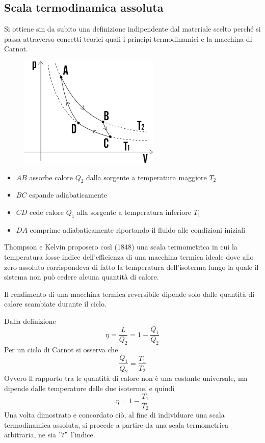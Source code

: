 \documentclass[a4paper, 15pt]{article}
\begin{document}
\subsection{Scala termodinamica assoluta}
\begin{adjustwidth}{2in}{}
	Si ottiene sin da subito una definizione indipendente dal materiale scelto perché si passa attraverso concetti teorici quali i principi termodinamici e la macchina di Carnot.
	\begin{figure}[H]
		\centering
		\includegraphics[width=0.3\linewidth]{immagini/screenshot002}
		\label{fig:screenshot002}
	\end{figure}
	\begin{itemize}
		\item $AB$ assorbe calore $Q_2$ dalla sorgente a temperatura maggiore $T_2$
		\item $BC$ espande adiabaticamente 
		\item $CD$ cede calore $Q_1$ alla sorgente a temperatura inferiore $T_1$
		\item $DA$ comprime adiabaticamente riportando il fluido alle condizioni iniziali
	\end{itemize}
	Thompson e Kelvin proposero così (1848) una scala termometrica in cui la temperatura fosse indice dell'efficienza di una macchina termica ideale dove allo zero assoluto corrispondeva di fatto la temperatura dell'isoterma lungo la quale il sistema non può cedere alcuna quantità di calore.
	
	Il rendimento di una macchina termica reversibile dipende solo dalle quantità di calore scambiate durante il ciclo.
	
	Dalla definizione
	\[\eta = \dfrac{L}{Q_2} = 1 - \dfrac{Q_1}{Q_2}\]
	Per un ciclo di Carnot si osserva che 
	\[\dfrac{Q_1}{Q_2} = \dfrac{T_1}{T_2}\] 
	Ovvero ll rapporto tra le quantità di calore non è una costante universale, ma dipende dalle temperature delle due isoterme, e quindi
	\[\eta = 1 - \dfrac{T_1}{T_2}\]
	Una volta dimostrato e concordato ciò, al fine di individuare una scala termodinamica assoluta, si procede a partire da una scala termometrica arbitraria, ne sia $"t"$ l'indice. 
	

\end{adjustwidth}
\end{document}
